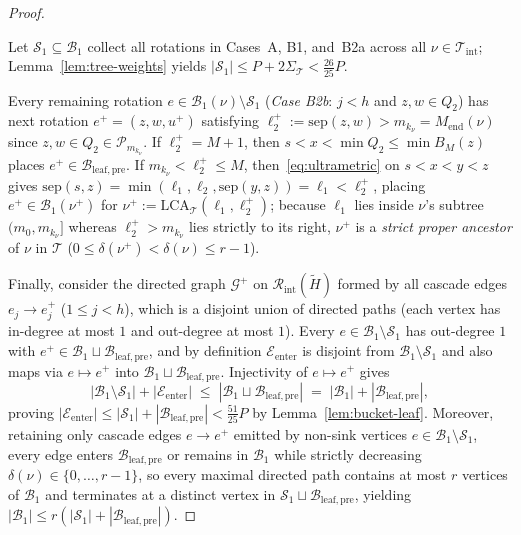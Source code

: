 \documentclass[11pt]{article}
\theoremstyle{definition}
\theoremstyle{remark}
\newcommand{\LCA}{\mathrm{LCA}}
\newcommand{\sep}{\mathrm{sep}}
\begin{document}
\begin{proof}
\begin{itemize}[leftmargin=2em]
\end{itemize}
Let $\mathcal{S}_1 \subseteq \mathcal{B}_1$ collect all rotations in Cases~A, B1, and~B2a across all $\nu \in \mathcal{T}_{\mathrm{int}}$; Lemma~\ref{lem:tree-weights} yields $|\mathcal{S}_1| \le P + 2\Sigma_{\mathcal{T}} < \frac{26}{25} P$.

Every remaining rotation $e \in \mathcal{B}_1(\nu) \setminus \mathcal{S}_1$ (\emph{Case B2b}: $j < h$ and $z, w \in Q_2$) has next rotation $e^+ = (z, w, u^+)$ satisfying $\ell_2^+ := \sep(z, w) > m_{k_\nu} = M_{\mathrm{end}}(\nu)$ since $z, w \in Q_2 \in \mathcal{P}_{m_{k_\nu}}$. If $\ell_2^+ = M + 1$, then $s < x < \min Q_2 \le \min B_M(z)$ places $e^+ \in \mathcal{B}_{\mathrm{leaf,pre}}$. If $m_{k_\nu} < \ell_2^+ \le M$, then~\eqref{eq:ultrametric} on $s < x < y < z$ gives $\sep(s, z) = \min(\ell_1, \ell_2, \sep(y, z)) = \ell_1 < \ell_2^+$, placing $e^+ \in \mathcal{B}_1(\nu^+)$ for $\nu^+ := \LCA_{\mathcal{T}}(\ell_1, \ell_2^+)$; because $\ell_1$ lies inside $\nu$'s subtree $(m_0, m_{k_\nu}]$ whereas $\ell_2^+ > m_{k_\nu}$ lies strictly to its right, $\nu^+$ is a \emph{strict proper ancestor} of $\nu$ in $\mathcal{T}$ ($0 \le \delta(\nu^+) < \delta(\nu) \le r - 1$).

Finally, consider the directed graph $\mathcal{G}^+$ on $\mathcal{R}_{\mathrm{int}}(\widetilde{H})$ formed by all cascade edges $e_j \to e_j^+$ ($1 \le j < h$), which is a disjoint union of directed paths (each vertex has in-degree at most $1$ and out-degree at most $1$). Every $e \in \mathcal{B}_1 \setminus \mathcal{S}_1$ has out-degree $1$ with $e^+ \in \mathcal{B}_1 \sqcup \mathcal{B}_{\mathrm{leaf,pre}}$, and by definition $\mathcal{E}_{\mathrm{enter}}$ is disjoint from $\mathcal{B}_1 \setminus \mathcal{S}_1$ and also maps via $e \mapsto e^+$ into $\mathcal{B}_1 \sqcup \mathcal{B}_{\mathrm{leaf,pre}}$. Injectivity of $e \mapsto e^+$ gives
\[
|\mathcal{B}_1 \setminus \mathcal{S}_1| + |\mathcal{E}_{\mathrm{enter}}| \;\le\; |\mathcal{B}_1 \sqcup \mathcal{B}_{\mathrm{leaf,pre}}| \;=\; |\mathcal{B}_1| + |\mathcal{B}_{\mathrm{leaf,pre}}|,
\]
proving $|\mathcal{E}_{\mathrm{enter}}| \le |\mathcal{S}_1| + |\mathcal{B}_{\mathrm{leaf,pre}}| < \frac{51}{25} P$ by Lemma~\ref{lem:bucket-leaf}. Moreover, retaining only cascade edges $e \to e^+$ emitted by non-sink vertices $e \in \mathcal{B}_1 \setminus \mathcal{S}_1$, every edge enters $\mathcal{B}_{\mathrm{leaf,pre}}$ or remains in $\mathcal{B}_1$ while strictly decreasing $\delta(\nu) \in \{0, \dots, r - 1\}$, so every maximal directed path contains at most $r$ vertices of $\mathcal{B}_1$ and terminates at a distinct vertex in $\mathcal{S}_1 \sqcup \mathcal{B}_{\mathrm{leaf,pre}}$, yielding $|\mathcal{B}_1| \le r(|\mathcal{S}_1| + |\mathcal{B}_{\mathrm{leaf,pre}}|)$.
\end{proof}
\end{document}
